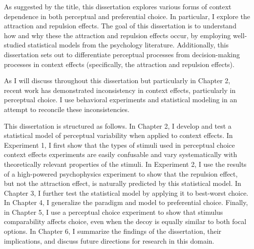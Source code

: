 As suggested by the title, this dissertation explores various forms of context dependence in both perceptual and preferential choice. In particular, I explore the attraction and repulsion effects. The goal of this dissertation is to understand how and why these the attraction and repulsion effects occur, by employing well-studied statistical models from the psychology literature. Additionally, this dissertation sets out to differentiate perceptual processes from decision-making processes in context effects (specifically, the attraction and repulsion effects).

As I will discuss throughout this dissertation but particularly in Chapter 2, recent work has demonstrated inconsistency in context effects, particularly in perceptual choice. I use behavioral experiments and statistical modeling in an attempt to reconcile these inconsistencies.

This dissertation is structured as follows. In Chapter 2, I develop and test a statistical model of perceptual variability when applied to context effects. In Experiment 1, I first show that the types of stimuli used in perceptual choice context effects experiments are easily confusable and vary systematically with theoretically relevant properties of the stimuli. In Experiment 2, I use the results of a high-powered psychophysics experiment to show that the repulsion effect, but not the attraction effect, is naturally predicted by this statistical model. In Chapter 3, I further test the statistical model by applying it to best-worst choice. In Chapter 4, I generalize the paradigm and model to preferential choice. Finally, in Chapter 5, I use a perceptual choice experiment to show that stimulus comparability affects choice, even when the decoy is equally similar to both focal options. In Chapter 6, I summarize the findings of the dissertation, their implications, and discuss future directions for research in this domain. 
